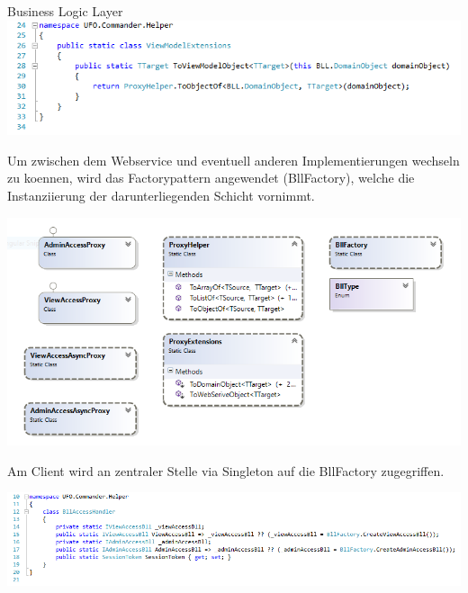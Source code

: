 \begin{section}{Business Logic Layer}
\includegraphics[angle=0, scale=0.45]{./img/domainclassesextension.PNG}
\FloatBarrier

Um zwischen dem Webservice und eventuell anderen Implementierungen wechseln zu koennen, wird das Factorypattern angewendet (BllFactory), welche die Instanziierung der darunterliegenden Schicht vornimmt.

\includegraphics[angle=0, scale=0.45]{./img/proxy.PNG}
\FloatBarrier

Am Client wird an zentraler Stelle via Singleton auf die BllFactory zugegriffen.

\includegraphics[angle=0, scale=0.45]{./img/proxyaccess.PNG}
\FloatBarrier

\end{section}


